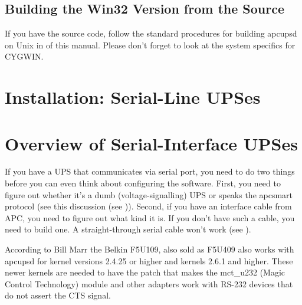 {{{{{{{{{\label{Building-the-Win32-Version-from-the-Source}

\subsection*{Building the Win32 Version from the Source}

\label{index-Windows_002c-Building-187}
\label{index-Building_002c-Windows-188}
If you have the source code, follow the standard procedures for building
apcupsd on Unix in 
 of this manual. Please
don't forget to look at the system specifics for CYGWIN. 

\label{Installation-on-Serial_002dLine-UPSes}

\section*{Installation: Serial-Line UPSes}

\label{Overview-of-Serial_002dInterface-UPSes}

\section*{Overview of Serial-Interface UPSes}

\label{index-Serial-UPSes-189}
If you have a UPS that communicates via serial port, you need to do two things
before you can even think about configuring the software. First, you need to
figure out whether it's a dumb (voltage-signalling) UPS or speaks the apcsmart
protocol (see this discussion (see 
)).  Second, if you have an interface
cable from APC, you need to figure out what kind it is.  If you don't have
such a cable, you need to build one.  A straight-through serial cable won't
work (see 
).  

According to Bill Marr the Belkin F5U109, also sold as F5U409 also works with
apcupsd for kernel versions 2.4.25 or higher and kernels 2.6.1 and higher. 
These newer kernels are needed to have the patch that makes the mct\_u232
(Magic Control Technology) module and other adapters work with RS-232 devices
that do not assert the CTS signal. 

}}}}}}}}}
